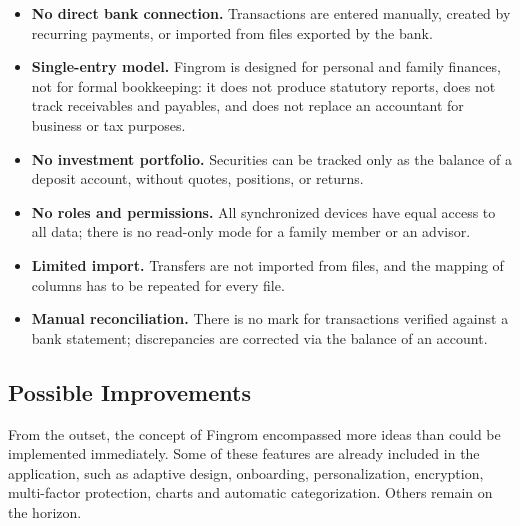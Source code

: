 \begin{itemize}
  \item \textbf{No direct bank connection.} Transactions are entered manually, created by
  recurring payments, or imported from files exported by the bank.
  \item \textbf{Single-entry model.} Fingrom is designed for personal and family finances,
  not for formal bookkeeping: it does not produce statutory reports, does not track
  receivables and payables, and does not replace an accountant for business or tax purposes.
  \item \textbf{No investment portfolio.} Securities can be tracked only as the balance of a
  deposit account, without quotes, positions, or returns.
  \item \textbf{No roles and permissions.} All synchronized devices have equal access to all
  data; there is no read-only mode for a family member or an advisor.
  \item \textbf{Limited import.} Transfers are not imported from files, and the mapping of
  columns has to be repeated for every file.
  \item \textbf{Manual reconciliation.} There is no mark for transactions verified against a
  bank statement; discrepancies are corrected via the balance of an account.
\end{itemize}


\subsection{Possible Improvements}

From the outset, the concept of Fingrom encompassed more ideas than could be implemented
immediately. Some of these features are already included in the application, such as adaptive
design, onboarding, personalization, encryption, multi-factor protection, charts and
automatic categorization. Others remain on the horizon.

